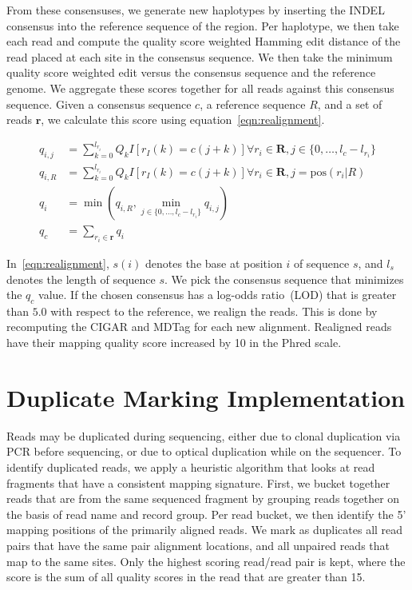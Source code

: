 \documentclass[phd]{ucbthesis}
\begin{document}
From these consensuses, we generate new haplotypes by inserting the INDEL consensus into the reference
sequence of the region. Per haplotype, we then take each read and compute the quality score weighted Hamming
edit distance of the read placed at each site in the consensus sequence. We then take the minimum quality
score weighted edit versus the consensus sequence and the reference genome. We aggregate these scores
together for all reads against this consensus sequence. Given a consensus sequence $c$, a reference sequence $R$,
and a set of reads $\mathbf{r}$, we calculate this score using equation~\eqref{eqn:realignment}.

\begin{align}
\label{eqn:realignment}
q_{i, j} &= \sum_{k = 0}^{l_{r_i}} Q_k I[r_I(k) = c(j + k)] \forall r_i \in \mathbf{R}, j \in \{0, \dots, l_c - l_{r_i}\}  \\
q_{i, R} &= \sum_{k = 0}^{l_{r_i}} Q_k I[r_I(k) = c(j + k)] \forall r_i \in \mathbf{R}, j = \text{pos}(r_i | R) \\
q_i &= \min(q_{i, R}, \min_{j \in \{0, \dots, l_c - l_{r_i}\}} q_{i, j}) \\
q_c &= \sum_{r_i \in \mathbf{r}} q_i
\end{align}

In~\eqref{eqn:realignment}, $s(i)$ denotes the base at position $i$ of sequence $s$, and $l_s$ denotes the
length of sequence $s$. We pick the consensus sequence that minimizes the $q_c$ value. If the chosen
consensus has a log-odds ratio~(LOD) that is greater than $5.0$ with respect to the reference, we realign the
reads. This is done by recomputing the CIGAR and MDTag for each new alignment. Realigned reads have their
mapping quality score increased by 10 in the Phred scale.

\section{Duplicate Marking Implementation}
\label{sec:duplicate-marking-implementation}

Reads may be duplicated during sequencing, either due to clonal duplication via PCR before sequencing, or
due to optical duplication while on the sequencer. To identify duplicated reads, we apply a heuristic algorithm
that looks at read fragments that have a consistent mapping signature. First, we bucket together reads that
are from the same sequenced fragment by grouping reads together on the basis of read name and record group.
Per read bucket, we then identify the 5' mapping positions of the primarily aligned reads.
We mark as duplicates all read pairs that have the same pair alignment locations, and all unpaired reads that
map to the same sites. Only the highest scoring read/read pair is kept, where the score is the sum of all quality
scores in the read that are greater than 15.
\end{document}
